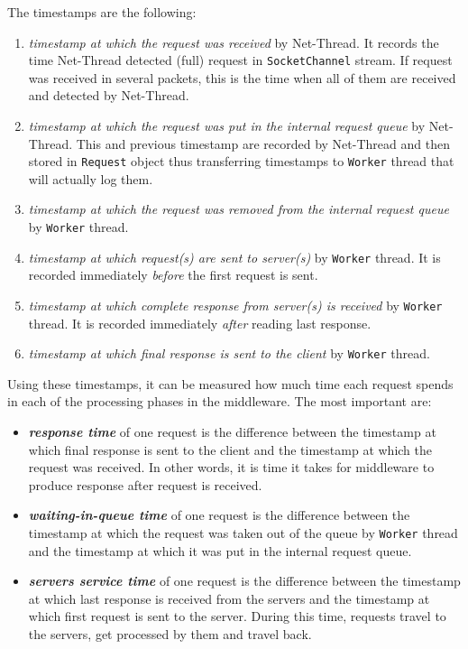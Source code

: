 \documentclass[11pt,a4paper]{article}
\begin{document}
The timestamps are the following:
\begin{enumerate}
	\item \textit{timestamp at which the request was received} by Net-Thread. It records the time Net-Thread detected (full) request in \texttt{SocketChannel} stream. If request was received in several packets, this is the time when all of them are received and detected by Net-Thread.
	\item \textit{timestamp at which the request was put in the internal request queue} by Net-Thread. This and previous timestamp are recorded by Net-Thread and then stored in \texttt{Request} object thus transferring timestamps to \texttt{Worker} thread that will actually log them.
	\item \textit{timestamp at which the request was removed from the internal request queue} by \texttt{Worker} thread.
	\item \textit{timestamp at which request(s) are sent to server(s)} by \texttt{Worker} thread. It is recorded immediately \textit{before} the first request is sent.
	\item \textit{timestamp at which complete response from server(s) is received} by \texttt{Worker} thread. It is recorded immediately \textit{after} reading last response.
	\item \textit{timestamp at which final response is sent to the client} by \texttt{Worker} thread.
\end{enumerate}
Using these timestamps, it can be measured how much time each request spends in each of the processing phases in the middleware. The most important are:
\begin{itemize}
	\item \textit{\textbf{response time}} of one request is the difference between the timestamp at which final response is sent to the client and the timestamp at which the request was received. In other words, it is time it takes for middleware to produce response after request is received.
	\item \textit{\textbf{waiting-in-queue time}} of one request is the difference between the timestamp at which the request was taken out of the queue by \texttt{Worker} thread and the timestamp at which it was put in the internal request queue.
	\item \textit{\textbf{servers service time}} of one request is the difference between the timestamp at which last response is received from the servers and the timestamp at which first request is sent to the server. During this time, requests travel to the servers, get processed by them and travel back.
\end{itemize}
\end{document}
